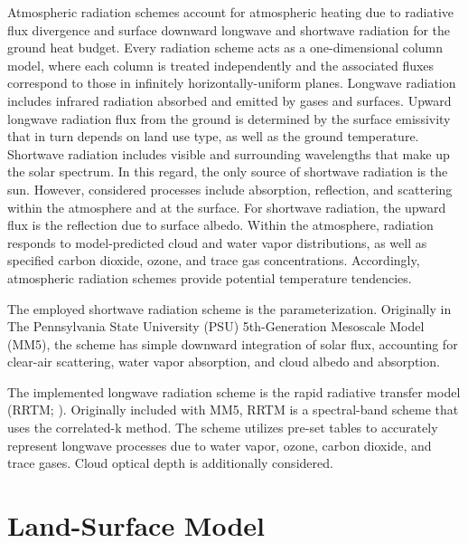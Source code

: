 Atmospheric radiation schemes account for atmospheric heating due to radiative flux divergence and surface downward longwave and shortwave radiation for the ground heat budget. Every radiation scheme acts as a one-dimensional column model, where each column is treated independently and the associated fluxes correspond to those in infinitely horizontally-uniform planes. Longwave radiation includes infrared radiation absorbed and emitted by gases and surfaces. Upward longwave radiation flux from the ground is determined by the surface emissivity that in turn depends on land use type, as well as the ground temperature. Shortwave radiation includes visible and surrounding wavelengths that make up the solar spectrum. In this regard, the only source of shortwave radiation is the sun. However, considered processes include absorption, reflection, and scattering within the atmosphere and at the surface. For shortwave radiation, the upward flux is the reflection due to surface albedo. Within the atmosphere, radiation responds to model-predicted cloud and water vapor distributions, as well as specified carbon dioxide, ozone, and trace gas concentrations. Accordingly, atmospheric radiation schemes provide potential temperature tendencies.

The employed shortwave radiation scheme is the  \citet{Dud89} parameterization. Originally in The Pennsylvania State University (PSU) 5th-Generation Mesoscale Model (MM5), the scheme has simple downward integration of solar flux, accounting for clear-air scattering, water vapor absorption, and cloud albedo and absorption.

The implemented longwave radiation scheme is the rapid radiative transfer model (RRTM; \citealt{Mlawer97}). Originally included with MM5, RRTM is a spectral-band scheme that uses the correlated-k method. The scheme utilizes pre-set tables to accurately represent longwave processes due to water vapor, ozone, carbon dioxide, and trace gases. Cloud optical depth is additionally considered.

\section{Land-Surface Model}
\label{lsm-34}

